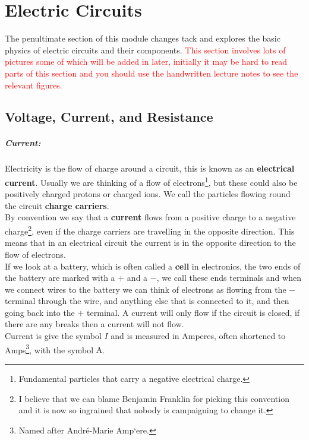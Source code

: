 
\chapter{Electric Circuits}
The penultimate section of this module changes tack and explores the basic physics of electric circuits and their components. \textcolor{red}{This section involves lots of pictures some of which will be added in later, initially it may be hard to read parts of this section and you should use the handwritten lecture notes to see the relevant figures.}

\section{Voltage, Current, and Resistance}
\paragraph{Current:} Electricity is the flow of charge around a circuit, this is known as an \textbf{electrical current}. Usually we are thinking of a flow of electrons\footnote{Fundamental particles that carry a negative electrical charge.}, but these could also be positively charged protons or charged ions. We call the particles flowing round the circuit \textbf{charge carriers}.\\

By convention we say that a \textbf{current} flows from a positive charge to a negative charge\footnote{I believe that we can blame Benjamin Franklin for picking this convention and it is now so ingrained that nobody is campaigning to change it.}, even if the charge carriers are travelling in the opposite direction. This means that in an electrical circuit the current is in the opposite direction to the flow of electrons.\\

If we look at a battery, which is often called a \textbf{cell} in electronics, the two ends of the battery are marked with a $+$ and a $-$, we call these ends terminals and when we connect wires to the battery we can think of electrons as flowing from the $-$ terminal through the wire, and anything else that is connected to it, and then going back into the $+$ terminal. A current will only flow if  the circuit is closed, if there are any breaks then a current will not flow.\\

Current is give the symbol $I$ and is measured in Amperes, often shortened to Amps\footnote{Named after Andr\'{e}-Marie Amp`{e}re.}, with the symbol $\text{A}$.\\

